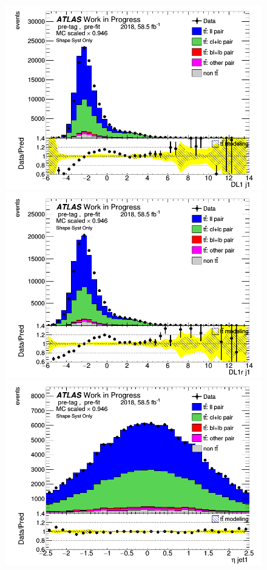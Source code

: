 \documentclass[letterpaper,12pt]{article}
\begin{document}
\begin{figure}[H]
\begin{minipage}[b]{.45\textwidth}
\centering
\includegraphics[width=1\textwidth]{Distribution_March/DataMC_J1_DL1.png}
\end{minipage}\hfill
\begin{minipage}[b]{.45\textwidth}
\centering
\includegraphics[width=1\textwidth]{Distribution_March/DataMC_J1_DL1r.png}
\end{minipage}\hfill
\begin{minipage}[b]{.45\textwidth}
\centering
\includegraphics[width=1\textwidth]{Distribution_March/DataMC_J1_eta.png}

\end{minipage}
\end{figure}
\end{document}
